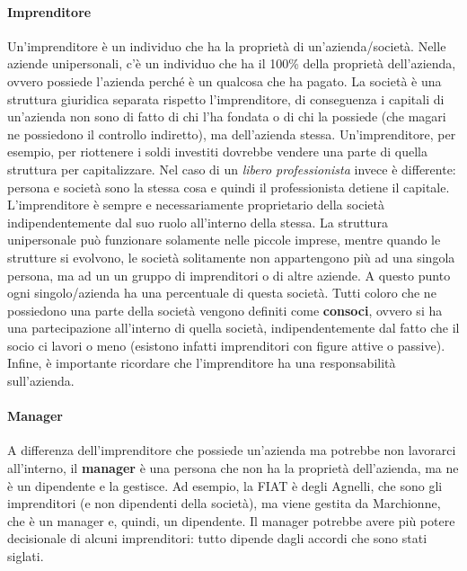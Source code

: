 \paragraph*{Imprenditore} Un'imprenditore è un individuo che ha la
proprietà di un'azienda/società. Nelle aziende unipersonali, c'è un individuo
che ha il 100\% della proprietà dell'azienda, ovvero possiede l'azienda perché
è un qualcosa che ha pagato. La società è una struttura giuridica separata
rispetto l'imprenditore, di conseguenza i capitali di un'azienda non sono di
fatto di chi l'ha fondata o di chi la possiede (che magari ne possiedono il
controllo indiretto), ma dell'azienda stessa. Un'imprenditore, per esempio, per
riottenere i soldi investiti dovrebbe vendere una parte di quella struttura per
capitalizzare. Nel caso di un \textit{libero professionista} invece è
differente: persona e società sono la stessa cosa e quindi il professionista
detiene il capitale. L'imprenditore è sempre e necessariamente proprietario
della società indipendentemente dal suo ruolo all'interno della stessa.
La struttura unipersonale può funzionare solamente nelle piccole imprese,
mentre quando le strutture si evolvono, le società solitamente non appartengono
più ad una singola persona, ma ad un un gruppo di imprenditori o di altre
aziende. A questo punto ogni singolo/azienda ha una percentuale di questa
società. Tutti coloro che ne possiedono una parte della società vengono
definiti come \textbf{consoci}, ovvero si ha una partecipazione all'interno di
quella società, indipendentemente dal fatto che il socio ci lavori o meno
(esistono infatti imprenditori con figure attive o passive). Infine, è
importante ricordare che l'imprenditore ha una responsabilità sull'azienda.

\paragraph*{Manager} A differenza dell'imprenditore che possiede un'azienda ma
potrebbe non lavorarci all'interno, il \textbf{manager} è una persona che non ha
la proprietà dell'azienda, ma ne è un dipendente e la gestisce.
Ad esempio, la FIAT è degli Agnelli, che sono gli imprenditori (e non
dipendenti della società), ma viene gestita da Marchionne, che è un manager e,
quindi, un dipendente. Il manager potrebbe avere più potere decisionale di 
alcuni imprenditori: tutto dipende dagli accordi che sono stati siglati.

